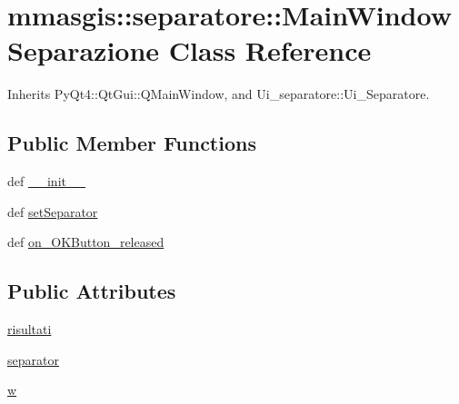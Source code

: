\hypertarget{classmmasgis_1_1separatore_1_1MainWindowSeparazione}{
\section{mmasgis::separatore::MainWindowSeparazione Class Reference}
\label{classmmasgis_1_1separatore_1_1MainWindowSeparazione}
}


Inherits PyQt4::QtGui::QMainWindow, and Ui\_\-separatore::Ui\_\-Separatore.

\subsection*{Public Member Functions}
\begin{DoxyCompactItemize}
\item 
def \hyperlink{classmmasgis_1_1separatore_1_1MainWindowSeparazione_ac8ad523573432b876493a46338f208d9}{\_\-\_\-init\_\-\_\-}
\item 
def \hyperlink{classmmasgis_1_1separatore_1_1MainWindowSeparazione_a43f6a9defc0aca61d2457c62266f86b8}{setSeparator}
\item 
def \hyperlink{classmmasgis_1_1separatore_1_1MainWindowSeparazione_ada4e84cdeb50449e18424690e37a35e8}{on\_\-OKButton\_\-released}
\end{DoxyCompactItemize}
\subsection*{Public Attributes}
\begin{DoxyCompactItemize}
\item 
\hyperlink{classmmasgis_1_1separatore_1_1MainWindowSeparazione_a62e3dc1a4244f1c7d9568e5db5fbfc86}{risultati}
\item 
\hyperlink{classmmasgis_1_1separatore_1_1MainWindowSeparazione_a2611f508d68a45f416eb3c066c3f531a}{separator}
\item 
\hyperlink{classmmasgis_1_1separatore_1_1MainWindowSeparazione_a0f504c51f055e94210c180cfbc8b325b}{w}
\end{DoxyCompactItemize}


